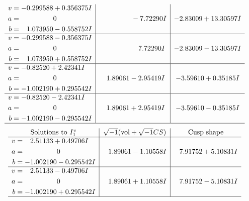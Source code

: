 \documentclass[1p]{elsarticle_modified}
\theoremstyle{definition}
\newcommand{\I}{\sqrt{-1}}
\begin{document}
$$\begin{array}{c|c|c}
\begin{aligned}
v &= -0.299588 + 0.356375 I \\
a &= \phantom{-0.000000 } 0 \\
b &= \phantom{-}1.073950 - 0.558752 I\end{aligned}
 & \phantom{-0.000000 } -7.72290 I & -2.83009 + 13.30597 I \\ \hline\begin{aligned}
v &= -0.299588 - 0.356375 I \\
a &= \phantom{-0.000000 } 0 \\
b &= \phantom{-}1.073950 + 0.558752 I\end{aligned}
 & \phantom{-0.000000 -}7.72290 I & -2.83009 - 13.30597 I \\ \hline\begin{aligned}
v &= -0.82520 + 2.42341 I \\
a &= \phantom{-0.000000 } 0 \\
b &= -1.002190 + 0.295542 I\end{aligned}
 & \phantom{-}1.89061 - 2.95419 I & -3.59610 + 0.35185 I \\ \hline\begin{aligned}
v &= -0.82520 - 2.42341 I \\
a &= \phantom{-0.000000 } 0 \\
b &= -1.002190 - 0.295542 I\end{aligned}
 & \phantom{-}1.89061 + 2.95419 I & -3.59610 - 0.35185 I\\
 \hline 
 \end{array}$$\newpage$$\begin{array}{c|c|c}  
\text{Solutions to }I^v_{1}& \I (\text{vol} + \sqrt{-1}CS) & \text{Cusp shape}\\
 \hline 
\begin{aligned}
v &= \phantom{-}2.51133 + 0.49706 I \\
a &= \phantom{-0.000000 } 0 \\
b &= -1.002190 - 0.295542 I\end{aligned}
 & \phantom{-}1.89061 - 1.10558 I & \phantom{-}7.91752 + 5.10831 I \\ \hline\begin{aligned}
v &= \phantom{-}2.51133 - 0.49706 I \\
a &= \phantom{-0.000000 } 0 \\
b &= -1.002190 + 0.295542 I\end{aligned}
 & \phantom{-}1.89061 + 1.10558 I & \phantom{-}7.91752 - 5.10831 I\\
 \hline 
 \end{array}$$\newpage
\end{document}
